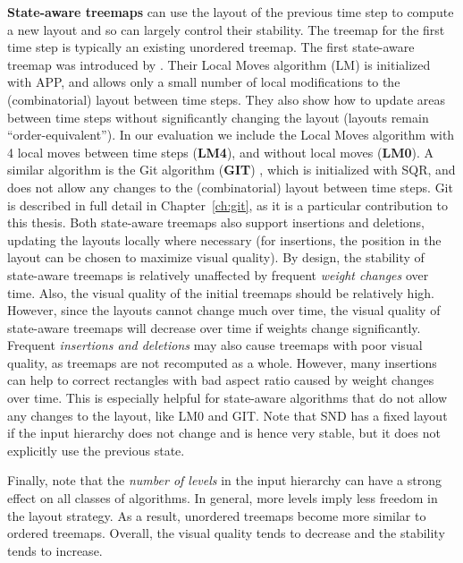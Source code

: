 \smallskip\noindent
\textbf{State-aware treemaps}
can use the layout of the previous time step to compute a new layout and so can largely control their stability. 
The treemap for the first time step is typically an existing unordered treemap. 
The first state-aware treemap was introduced by \cite{sondag17}. Their Local Moves algorithm (LM) is initialized with APP, and allows only a small number of local modifications to the (combinatorial) layout between time steps. They also show how to update areas between time steps without significantly changing the layout (layouts remain ``order-equivalent''). In our evaluation we include the Local Moves algorithm with 4 local moves between time steps (\textbf{LM4}), and without local moves (\textbf{LM0}). A similar algorithm is the Git algorithm (\textbf{GIT}) \cite{vernier18git}, which is initialized with SQR, and does not allow any changes to the (combinatorial) layout between time steps. Git is described in full detail in Chapter~\ref{ch:git}, as it is a particular contribution to this thesis.
Both state-aware treemaps also support insertions and deletions, updating the layouts locally where necessary (for insertions, the position in the layout can be chosen to maximize visual quality).
%
By design, the stability of state-aware treemaps is relatively unaffected by frequent \emph{weight changes} over time. Also, the visual quality of the initial treemaps should be relatively high. However, since the layouts cannot change much over time, the visual quality of state-aware treemaps will decrease over time if weights change significantly. Frequent \emph{insertions and deletions} may also cause treemaps with poor visual quality, as treemaps are not recomputed as a whole. However, many insertions can help to correct rectangles with bad aspect ratio caused by weight changes over time. This is especially helpful for state-aware algorithms that do not allow any changes to the layout, like LM0 and GIT. Note that SND has a fixed layout if the input hierarchy does not change and is hence very stable, but it does not explicitly use the previous state.

Finally, note that the \emph{number of levels} in the input hierarchy can have a strong effect on all classes of algorithms. In general, more levels imply less freedom in the layout strategy. As a result, unordered treemaps become more similar to ordered treemaps. Overall, the visual quality tends to decrease and the stability tends to increase. 

